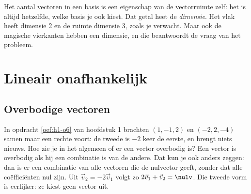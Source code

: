 Het aantal vectoren in een basis is een eigenschap van de vectorruimte zelf: het is altijd hetzelfde, welke basis je ook kiest. Dat getal heet de \textit{dimensie}. Het vlak heeft dimensie 2 en de ruimte dimensie 3, zoals je verwacht. Maar ook de magische vierkanten hebben een dimensie, en die beantwoordt de vraag van het probleem.

\begin{oefeningen}[Start]

\end{oefeningen}


\section{Lineair onafhankelijk}

\subsection{Overbodige vectoren}

In opdracht \ref{oef:h1-o6} van hoofdstuk 1 brachten $(1, -1, 2)$ en $(-2, 2, -4)$ samen maar een rechte voort: de tweede is $-2$ keer de eerste, en brengt niets nieuws. Hoe zie je in het algemeen of er een vector overbodig is? Een vector is overbodig als hij een combinatie is van de andere. Dat kun je ook anders zeggen: dan is er een combinatie van alle vectoren die de nulvector geeft, zonder dat alle coëfficiënten nul zijn. Uit $\vec v_2 = -2\vec v_1$ volgt zo $2\vec v_1 + \vec v_2 = \nulv$. Die tweede vorm is eerlijker: ze kiest geen vector uit.

